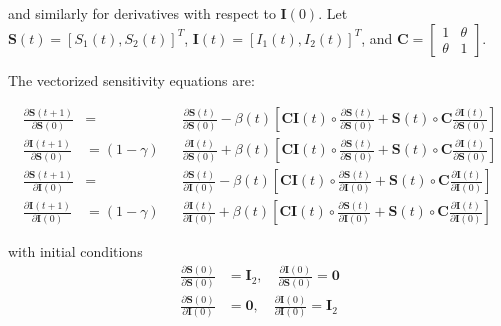 and similarly for derivatives with respect to $\mathbf{I}(0)$. Let
$\mathbf{S}(t) = [S_1(t), S_2(t)]^T$, $\mathbf{I}(t) = [I_1(t),
I_2(t)]^T$, and $\mathbf{C} = \begin{bmatrix} 1 & \theta \\ \theta &
1 \end{bmatrix}$.

The vectorized sensitivity equations are:

\begin{align}
  \frac{\partial \mathbf{S}(t+1)}{\partial \mathbf{S}(0)} &= &&\frac{\partial \mathbf{S}(t)}{\partial \mathbf{S}(0)} - \beta(t) \left[ \mathbf{C} \mathbf{I}(t) \circ \frac{\partial \mathbf{S}(t)}{\partial \mathbf{S}(0)} + \mathbf{S}(t) \circ \mathbf{C} \frac{\partial \mathbf{I}(t)}{\partial \mathbf{S}(0)} \right] \\
  \frac{\partial \mathbf{I}(t+1)}{\partial \mathbf{S}(0)} &= (1-\gamma) &&\frac{\partial \mathbf{I}(t)}{\partial \mathbf{S}(0)} + \beta(t) \left[ \mathbf{C} \mathbf{I}(t) \circ \frac{\partial \mathbf{S}(t)}{\partial \mathbf{S}(0)} + \mathbf{S}(t) \circ \mathbf{C} \frac{\partial \mathbf{I}(t)}{\partial \mathbf{S}(0)} \right] \\
  \frac{\partial \mathbf{S}(t+1)}{\partial \mathbf{I}(0)} &= &&\frac{\partial \mathbf{S}(t)}{\partial \mathbf{I}(0)} - \beta(t) \left[ \mathbf{C} \mathbf{I}(t) \circ \frac{\partial \mathbf{S}(t)}{\partial \mathbf{I}(0)} + \mathbf{S}(t) \circ \mathbf{C} \frac{\partial \mathbf{I}(t)}{\partial \mathbf{I}(0)} \right] \\
  \frac{\partial \mathbf{I}(t+1)}{\partial \mathbf{I}(0)} &= (1-\gamma)&&\frac{\partial \mathbf{I}(t)}{\partial \mathbf{I}(0)} + \beta(t) \left[ \mathbf{C} \mathbf{I}(t) \circ \frac{\partial \mathbf{S}(t)}{\partial \mathbf{I}(0)} + \mathbf{S}(t) \circ \mathbf{C} \frac{\partial \mathbf{I}(t)}{\partial \mathbf{I}(0)} \right]
\end{align}

with initial conditions
\begin{align}
\frac{\partial \mathbf{S}(0)}{\partial \mathbf{S}(0)} &= \mathbf{I}_2, \quad \frac{\partial \mathbf{I}(0)}{\partial \mathbf{S}(0)} = \mathbf{0} \\
\frac{\partial \mathbf{S}(0)}{\partial \mathbf{I}(0)} &= \mathbf{0}, \quad \frac{\partial \mathbf{I}(0)}{\partial \mathbf{I}(0)} = \mathbf{I}_2
\end{align}

